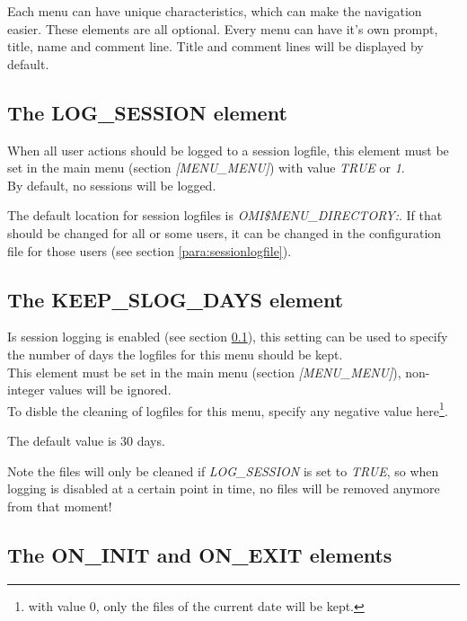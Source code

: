 \documentclass[a4paper]{book}
\newcommand{\vs}{\vspace{3mm}}
\begin{document}
Each menu can have unique characteristics, which can make the navigation 
easier. These elements are all optional. Every menu can have it's own 
prompt, title, name and comment line. Title and comment lines will be 
displayed by default.

\subsection{The LOG{\_}SESSION element}\label{subsec:logsession}

When all user actions should be logged to a session logfile, this element must be set in the main menu (section \textsl{[MENU{\_}MENU]}) with value \textsl{TRUE} or \textsl{1}.\\
By default, no sessions will be logged.

\vs

The default location for session logfiles is \textsl{OMI{\$}MENU{\_}DIRECTORY:}. If that should be changed for all or some users, it can be changed in the configuration file for those users (see section \ref{para:sessionlogfile}).

\subsection{The KEEP{\_}SLOG{\_}DAYS element}\label{subsec:cleansessionlog}

Is session logging is enabled (see section \ref{subsec:logsession}), this setting can be used to specify the number of days the logfiles for this menu should be kept.\\
This element must be set in the main menu (section \textsl{[MENU{\_}MENU]}), non-integer values will be ignored.\\
To disble the cleaning of  logfiles for this menu, specify any negative value here\footnote{ with value 0, only the files of the current date will be kept.}.

The default value is 30 days.

\vs

Note the files will only be cleaned if \textsl{LOG{\_}SESSION} is set to \textsl{TRUE}, so when logging is disabled at a certain point in time, no files will be removed anymore from that moment!

\subsection{The ON{\_}INIT and ON{\_}EXIT elements}
\label{subsubsec:mylabel22}
\end{document}

